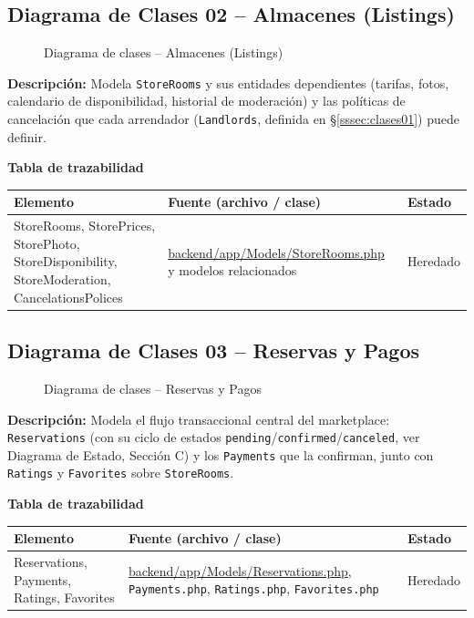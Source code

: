 \subsection{Diagrama de Clases 02 -- Almacenes (Listings)}
\label{sssec:clases02}
\begin{figure}[H]
    \centering
    \caption{Diagrama de clases -- Almacenes (Listings)}
    \label{fig:clases02}
\end{figure}
\noindent\textbf{Descripción:} Modela \texttt{StoreRooms} y sus entidades dependientes (tarifas, fotos, calendario de disponibilidad, historial de moderación) y las políticas de cancelación que cada arrendador (\texttt{Landlords}, definida en \S\ref{sssec:clases01}) puede definir.

\bigskip
\noindent\textbf{Tabla de trazabilidad}
\begin{longtable}{|L{5.5cm}|L{7.5cm}|M{2cm}|}
\hline
{} \textbf{Elemento} & \textbf{Fuente (archivo / clase)} & \textbf{Estado} \\ \hline
\endhead
StoreRooms, StorePrices, StorePhoto, StoreDisponibility, StoreModeration, CancelationsPolices & \url{backend/app/Models/StoreRooms.php} y modelos relacionados & Heredado \\ \hline
\end{longtable}
\clearpage

\subsection{Diagrama de Clases 03 -- Reservas y Pagos}
\label{sssec:clases03}
\begin{figure}[H]
    \centering
    \caption{Diagrama de clases -- Reservas y Pagos}
    \label{fig:clases03}
\end{figure}
\noindent\textbf{Descripción:} Modela el flujo transaccional central del marketplace: \texttt{Reservations} (con su ciclo de estados \texttt{pending}/\texttt{confirmed}/\texttt{canceled}, ver Diagrama de Estado, Sección C) y los \texttt{Payments} que la confirman, junto con \texttt{Ratings} y \texttt{Favorites} sobre \texttt{StoreRooms}.

\bigskip
\noindent\textbf{Tabla de trazabilidad}
\begin{longtable}{|L{5.5cm}|L{7.5cm}|M{2cm}|}
\hline
{} \textbf{Elemento} & \textbf{Fuente (archivo / clase)} & \textbf{Estado} \\ \hline
\endhead
Reservations, Payments, Ratings, Favorites & \url{backend/app/Models/Reservations.php}, \texttt{Payments.php}, \texttt{Ratings.php}, \texttt{Favorites.php} & Heredado \\ \hline
\end{longtable}
\clearpage

